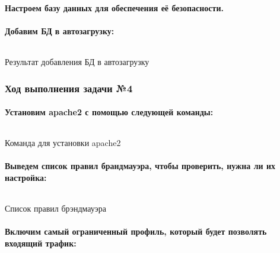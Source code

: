 \paragraph{Настроем базу данных для обеспечения её безопасности.}

\paragraph{Добавим БД в автозагрузку:}

\begin{code}
	\inputminted[breaklines=true, xleftmargin=1em, linenos, frame=single, framesep=10pt, fontsize=\footnotesize, firstline=1, lastline=33]{haskell}{fig/database.bash}
	\caption{Результат добавления БД в автозагрузку}
\end{code}

\subsubsection{Ход выполнения задачи №4}

\paragraph{Установим apache2 с помощью следующей команды:}

\begin{code}
	\inputminted[breaklines=true, xleftmargin=1em, linenos, frame=single, framesep=10pt, fontsize=\footnotesize, firstline=1, lastline=33]{haskell}{fig/apache2.bash}
	\caption{Команда для установки apache2}
\end{code}

\paragraph{Выведем список правил брандмауэра, чтобы проверить, нужна ли их настройка:}

\begin{code}
	\inputminted[breaklines=true, xleftmargin=1em, linenos, frame=single, framesep=10pt, fontsize=\footnotesize, firstline=1, lastline=33]{haskell}{fig/status.bash}
	\caption{Список правил брэндмауэра}
\end{code}

\paragraph{Включим самый ограниченный профиль, который будет позволять входящий трафик:}

